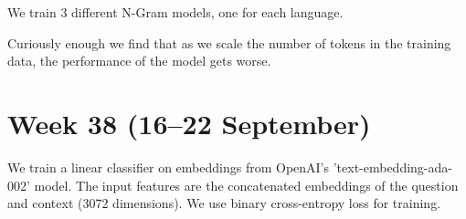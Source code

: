\documentclass[11pt]{article}
\begin{document}
We train 3 different N-Gram models, one for each language.

Curiously enough we find that as we scale the number of tokens in the training data, the performance of the model gets worse.
\begin{table}[ht]
    \centering
    \caption{Language Model Performance}
    \label{tab:language_model_performance}
\end{table}



\section{Week 38 (16--22 September)}

We train a linear classifier on embeddings from OpenAI's 'text-embedding-ada-002' model. 
The input features are the concatenated embeddings of the question and context (3072 dimensions). 
We use binary cross-entropy loss for training.
\end{document}
